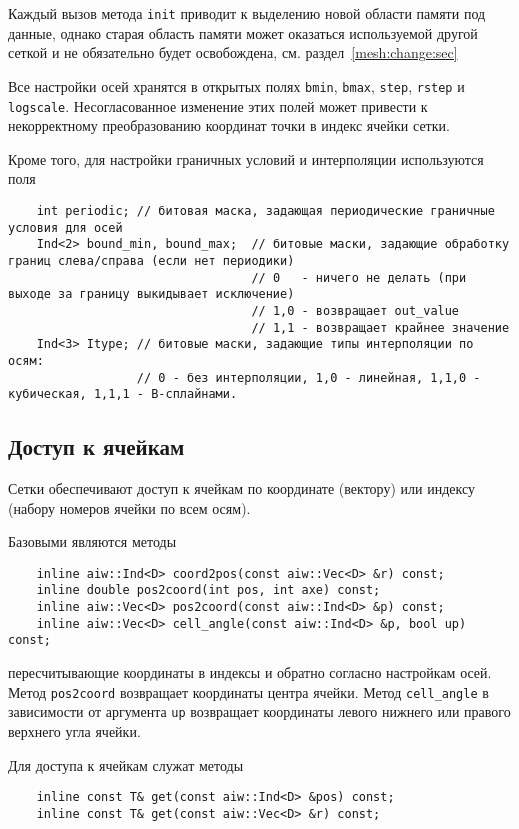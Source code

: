 Каждый вызов метода \verb'init' приводит к выделению новой области памяти под данные, однако старая область памяти
может оказаться используемой другой сеткой и не обязательно будет освобождена, см. раздел~\ref{mesh:change:sec}

Все настройки осей хранятся в открытых полях \verb'bmin', \verb'bmax', \verb'step',
\verb'rstep' и \verb'logscale'. 
Несогласованное изменение этих полей может привести к некорректному преобразованию координат точки
в индекс ячейки сетки.

Кроме того, для настройки граничных условий и интерполяции используются поля
\begin{verbatim}
    int periodic; // битовая маска, задающая периодические граничные условия для осей
    Ind<2> bound_min, bound_max;  // битовые маски, задающие обработку границ слева/справа (если нет периодики)
		                          // 0   - ничего не делать (при выходе за границу выкидывает исключение)
		                          // 1,0 - возвращает out_value
		                          // 1,1 - возвращает крайнее значение
    Ind<3> Itype; // битовые маски, задающие типы интерполяции по осям:
                  // 0 - без интерполяции, 1,0 - линейная, 1,1,0 - кубическая, 1,1,1 - B-сплайнами.
\end{verbatim}


\subsection{Доступ к ячейкам}
Сетки обеспечивают доступ к ячейкам по координате (вектору) или индексу (набору номеров ячейки по всем осям).

Базовыми являются методы
\begin{verbatim}
    inline aiw::Ind<D> coord2pos(const aiw::Vec<D> &r) const;
    inline double pos2coord(int pos, int axe) const;
    inline aiw::Vec<D> pos2coord(const aiw::Ind<D> &p) const;
    inline aiw::Vec<D> cell_angle(const aiw::Ind<D> &p, bool up) const;
\end{verbatim}
пересчитывающие координаты в индексы и обратно согласно настройкам осей. Метод \verb'pos2coord' возвращает координаты 
центра ячейки. Метод \verb'cell_angle' в зависимости от аргумента \verb'up' возвращает координаты левого нижнего или правого верхнего угла ячейки. 

Для доступа к ячейкам служат методы
\begin{verbatim}
    inline const T& get(const aiw::Ind<D> &pos) const;
    inline const T& get(const aiw::Vec<D> &r) const;
\end{verbatim}


